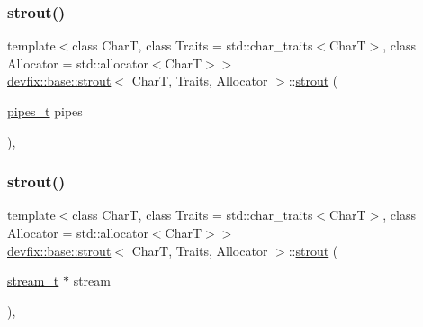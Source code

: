 \subsubsection{\texorpdfstring{strout()}{strout()}\hspace{0.1cm}{\footnotesize\ttfamily [1/3]}}
{\footnotesize\ttfamily template$<$class CharT, class Traits = std\+::char\+\_\+traits$<$\+Char\+T$>$, class Allocator = std\+::allocator$<$\+Char\+T$>$$>$ \\
\hyperlink{structdevfix_1_1base_1_1strout}{devfix\+::base\+::strout}$<$ CharT, Traits, Allocator $>$\+::\hyperlink{structdevfix_1_1base_1_1strout}{strout} (\begin{DoxyParamCaption}\item[{\hyperlink{structdevfix_1_1base_1_1strout_acf852ff3e37e6d10e2cf0332df2b8e2d}{pipes\+\_\+t}}]{pipes }\end{DoxyParamCaption})\hspace{0.3cm}{\ttfamily [inline]}, {\ttfamily [explicit]}}

\mbox{\label{structdevfix_1_1base_1_1strout_a87b4c01cbcd87414d2c3a639713fcd08}} 
\subsubsection{\texorpdfstring{strout()}{strout()}\hspace{0.1cm}{\footnotesize\ttfamily [2/3]}}
{\footnotesize\ttfamily template$<$class CharT, class Traits = std\+::char\+\_\+traits$<$\+Char\+T$>$, class Allocator = std\+::allocator$<$\+Char\+T$>$$>$ \\
\hyperlink{structdevfix_1_1base_1_1strout}{devfix\+::base\+::strout}$<$ CharT, Traits, Allocator $>$\+::\hyperlink{structdevfix_1_1base_1_1strout}{strout} (\begin{DoxyParamCaption}\item[{\hyperlink{structdevfix_1_1base_1_1strout_a158aadfad348eeac7c56a8b43699a4d3}{stream\+\_\+t} $\ast$}]{stream }\end{DoxyParamCaption})\hspace{0.3cm}{\ttfamily [inline]}, {\ttfamily [explicit]}}

\mbox{\label{structdevfix_1_1base_1_1strout_a83d80540c9614d8d825a45acede871c5}} 
